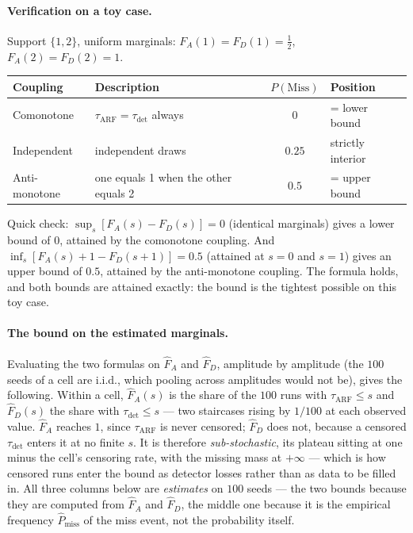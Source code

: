 \documentclass[11pt,a4paper]{article}
\begin{document}
\paragraph{Verification on a toy case.} Support $\{1,2\}$, uniform marginals:
$F_A(1)=F_D(1)=\tfrac12$, $F_A(2)=F_D(2)=1$.

\begin{center}
\begin{tabular}{llcl}
\toprule
Coupling & Description & $P(\mathrm{Miss})$ & Position \\
\midrule
Comonotone & $\tau_{\mathrm{ARF}} = \tau_{\mathrm{det}}$ always & $0$ & = lower bound \\
Independent & independent draws & $0.25$ & strictly interior \\
Anti-monotone & one equals 1 when the other equals 2 & $0.5$ & = upper bound \\
\bottomrule
\end{tabular}
\end{center}

Quick check: $\sup_s[F_A(s)-F_D(s)]=0$ (identical marginals) gives a lower bound of
$0$, attained by the comonotone coupling. And
$\inf_s[F_A(s)+1-F_D(s+1)]=0.5$ (attained at $s=0$ and $s=1$) gives an upper bound of
$0.5$, attained by the anti-monotone coupling. The formula holds, and both bounds are
attained exactly: the bound is the tightest possible on this toy case.

\paragraph{The bound on the estimated marginals.} Evaluating the two formulas on
$\hat F_A$ and $\hat F_D$, amplitude by amplitude (the $100$ seeds of a cell are i.i.d.,
which pooling across amplitudes would not be), gives the following. Within a cell,
$\hat F_A(s)$ is the share of the $100$ runs with $\tau_{\mathrm{ARF}} \le s$ and
$\hat F_D(s)$ the share with $\tau_{\mathrm{det}} \le s$ --- two staircases rising by
$1/100$ at each observed value. $\hat F_A$ reaches $1$, since $\tau_{\mathrm{ARF}}$ is
never censored; $\hat F_D$ does not, because a censored $\tau_{\mathrm{det}}$ enters it at
no finite $s$. It is therefore \emph{sub-stochastic}, its plateau sitting at one minus the
cell's censoring rate, with the missing mass at $+\infty$ --- which is how censored runs
enter the bound as detector losses rather than as data to be filled in. All three columns below are \emph{estimates} on
$100$ seeds --- the two bounds because they are computed from $\hat F_A$ and $\hat F_D$,
the middle one because it is the empirical frequency $\hat P_{\mathrm{miss}}$ of the miss
event, not the probability itself.
\end{document}
